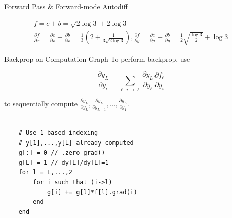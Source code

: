\begin{frame}[allowframebreaks]
\begin{myexampleblock}{6.42}{Forward Pass & Forward-mode Autodiff}
\begin{itemize}
        $$
        \begin{gathered}
        f=c+b=\sqrt{2 \log 3}+2 \log 3 \\
        \frac{\partial f}{\partial x}=\frac{\partial c}{\partial x}+\frac{\partial b}{\partial x}=\frac{1}{3}\left(2+\frac{1}{3 \sqrt{2 \log 3}}\right), \frac{\partial f}{\partial y}=\frac{\partial c}{\partial y}+\frac{\partial b}{\partial y}=\frac{1}{2} \sqrt{\frac{\log 3}{2}}+\log 3
        \end{gathered}
        $$
    \end{itemize}
\end{myexampleblock}

\end{frame}

\begin{frame}[allowframebreaks]

\begin{mydefinitionblock}{6.42}{Backprop on Computation Graph}
    To perform backprop, use

    $$
    \frac{\partial y_{L}}{\partial y_{i}}=\sum_{\ell: i \rightarrow \ell} \frac{\partial y_{L}}{\partial y_{\ell}} \frac{\partial f_{\ell}}{\partial y_{i}}
    $$

    to sequentially compute $\frac{\partial y_{L}}{\partial y_{L}}, \frac{\partial y_{L}}{\partial y_{L-1}}, \ldots, \frac{\partial y_{L}}{\partial y_{1}}$.\\\\ 

    \begin{verbatim}
    # Use 1-based indexing
    # y[1],...,y[L] already computed
    g[:] = 0 // .zero_grad()
    g[L] = 1 // dy[L]/dy[L]=1
    for l = L,...,2
        for i such that (i->l)
            g[i] += g[l]*f[l].grad(i)
        end
    end
    \end{verbatim}
\end{mydefinitionblock}

\end{frame}

